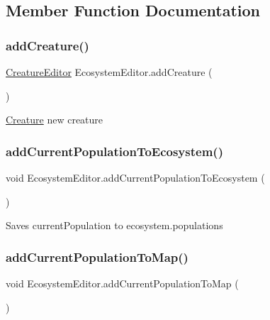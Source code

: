 \subsection{Member Function Documentation}
\mbox{\label{class_ecosystem_editor_a818800b8e8a812dd061e85a8f2a483b7}} 
\subsubsection{\texorpdfstring{add\+Creature()}{addCreature()}}
{\footnotesize\ttfamily \mbox{\hyperlink{class_creature_editor}{Creature\+Editor}} Ecosystem\+Editor.\+add\+Creature (\begin{DoxyParamCaption}{ }\end{DoxyParamCaption})}



\mbox{\hyperlink{class_creature}{Creature}} new creature 

\mbox{\label{class_ecosystem_editor_a8a9917b9c31e71e610d9e4b231930ce3}} 
\subsubsection{\texorpdfstring{add\+Current\+Population\+To\+Ecosystem()}{addCurrentPopulationToEcosystem()}}
{\footnotesize\ttfamily void Ecosystem\+Editor.\+add\+Current\+Population\+To\+Ecosystem (\begin{DoxyParamCaption}{ }\end{DoxyParamCaption})}



Saves current\+Population to ecosystem.\+populations 

\mbox{\label{class_ecosystem_editor_af6f631b9a71a8e1f7de9d48d18ddd08a}} 
\subsubsection{\texorpdfstring{add\+Current\+Population\+To\+Map()}{addCurrentPopulationToMap()}}
{\footnotesize\ttfamily void Ecosystem\+Editor.\+add\+Current\+Population\+To\+Map (\begin{DoxyParamCaption}{ }\end{DoxyParamCaption})}




